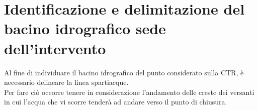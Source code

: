 \section{Identificazione e delimitazione del bacino idrografico sede dell'intervento}

Al fine di individuare il bacino idrografico del punto considerato sulla CTR, è necessario delineare la linea spartiacque.\\
Per fare ciò occorre tenere in considerazione l'andamento delle creste dei versanti in cui l'acqua che vi scorre tenderà ad andare verso il punto di chiusura. 